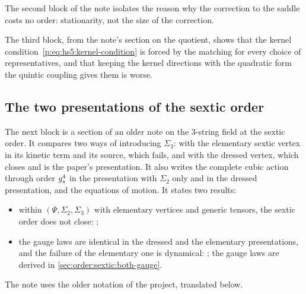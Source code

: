The second block of the note isolates the reason why the correction to the saddle costs no order: stationarity, not the size of the correction.



The third block, from the note's section on the quotient, shows that the kernel condition~\eqref{p:eq:hs5:kernel-condition} is forced by the matching for every choice of representatives, and that keeping the kernel directions with the quadratic form the quintic coupling gives them is worse.



\subsection{The two presentations of the sextic order}
\label{sec:order:sextic-presentations}

The next block is a section of an older note on the $3$-string field at the sextic order.
It compares two ways of introducing $\Sigma_3$: with the elementary sextic vertex in its kinetic term and its source, which fails, and with the dressed vertex, which closes and is the paper's presentation.
It also writes the complete cubic action through order $g_s^4$ in the presentation with $\Sigma_2$ only and in the dressed presentation, and the equations of motion.
It states two results:
\begin{itemize}
  \item within $(\Psi, \Sigma_2, \Sigma_3)$ with elementary vertices and generic tensors, the sextic order does not close: ;
  \item the gauge laws are identical in the dressed and the elementary presentations, and the failure of the elementary one is dynamical: ; the gauge laws are derived in \cref{sec:order:sextic:both-gauge}.
\end{itemize}
The note uses the older notation of the project, translated below.

